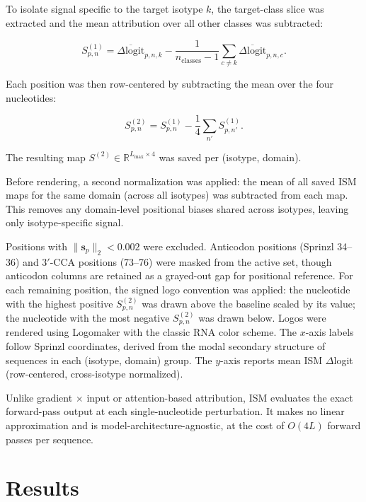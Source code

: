 \documentclass{article}
\begin{document}
To isolate signal specific to the target isotype $k$, the target-class slice was extracted and the mean attribution over all other classes was subtracted:

\begin{equation}
S^{(1)}_{p,n}
= \overline{\Delta \mathrm{logit}}_{p,n,k}
- \frac{1}{n_{\mathrm{classes}} - 1}
\sum_{c \neq k} \overline{\Delta \mathrm{logit}}_{p,n,c}.
\end{equation}

Each position was then row-centered by subtracting the mean over the four nucleotides:

\begin{equation}
S^{(2)}_{p,n}
= S^{(1)}_{p,n}
- \frac{1}{4} \sum_{n'} S^{(1)}_{p,n'}.
\end{equation}


The resulting map $S^{(2)} \in \mathbb{R}^{L_{\max} \times 4}$ was saved per (isotype, domain).

Before rendering, a second normalization was applied: the mean of all saved ISM maps for the same domain (across all isotypes) was subtracted from each map. This removes any domain-level positional biases shared across isotypes, leaving only isotype-specific signal.

Positions with $\lVert \mathbf{s}_p \rVert_2 < 0.002$ were excluded. Anticodon positions (Sprinzl 34--36) and 3$'$-CCA positions (73--76) were masked from the active set, though anticodon columns are retained as a grayed-out gap for positional reference. For each remaining position, the signed logo convention was applied: the nucleotide with the highest positive $S^{(2)}_{p,n}$ was drawn above the baseline scaled by its value; the nucleotide with the most negative $S^{(2)}_{p,n}$ was drawn below. Logos were rendered using Logomaker with the classic RNA color scheme. The $x$-axis labels follow Sprinzl coordinates, derived from the modal secondary structure of sequences in each (isotype, domain) group. The $y$-axis reports mean ISM $\Delta$logit (row-centered, cross-isotype normalized).

Unlike gradient $\times$ input or attention-based attribution, ISM evaluates the exact forward-pass output at each single-nucleotide perturbation. It makes no linear approximation and is model-architecture-agnostic, at the cost of $O(4L)$ forward passes per sequence.

\section{Results}
\end{document}
